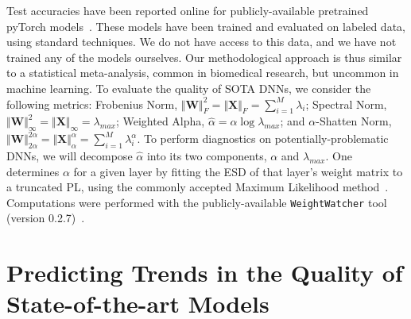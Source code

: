 \documentclass{article}
\begin{document}
Test accuracies have been reported online for publicly-available pretrained pyTorch models~\citep{osmr}.
These models have been trained and evaluated on labeled data, using standard techniques.  
We do not have access to this data, and we have not trained any of the models ourselves. 
Our methodological approach is thus similar to a statistical meta-analysis, common in biomedical research, but uncommon in machine learning.
%
To evaluate the quality of SOTA DNNs, we consider the following metrics:
Frobenius Norm, $\Vert\mathbf{W}\Vert^{2}_{F}=\Vert\mathbf{X}\Vert_{F}=\sum\nolimits_{i=1}^{M} \lambda_{i}$; 
Spectral Norm, $\Vert\mathbf{W}\Vert_{\infty}^{2}=\Vert\mathbf{X}\Vert_{\infty}=\lambda_{max}$;
Weighted Alpha, $\hat{\alpha}=\alpha\log\lambda_{max}$; and
$\alpha$-Shatten Norm, $\Vert\mathbf{W}\Vert^{2\alpha}_{2\alpha}=\Vert\mathbf{X}\Vert^{\alpha}_{\alpha}=\sum\nolimits_{i=1}^{M}\lambda_{i}^{\alpha}$. 
To perform diagnostics on potentially-problematic DNNs, we will decompose $\hat{\alpha}$ into its two components, $\alpha$ and $\lambda_{max}$.
One determines $\alpha$ for a given layer by fitting the ESD of that layer's weight matrix to a truncated PL, using the commonly accepted Maximum Likelihood method~\citep{CSN09_powerlaw,ABP14}.
Computations were performed with the publicly-available \texttt{WeightWatcher} tool (version 0.2.7)~\citep{weightwatcher_package}.


\section{Predicting Trends in the Quality of State-of-the-art Models}


\end{document}
